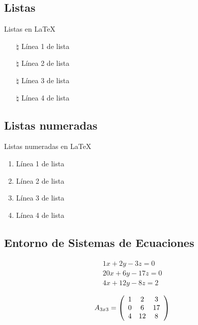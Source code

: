 \documentclass[12pt]{beamer}
\begin{document}
\subsection{Listas}
\begin{frame}{Listas en \LaTeX}
\begin{itemize}
\item[$\natural$] Línea 1 de lista
\item[$\natural$] Línea 2 de lista
\item[$\natural$] Línea 3 de lista
\item[$\natural$] Línea 4 de lista
\end{itemize}
\end{frame}

\subsection{Listas numeradas}
\begin{frame}{Listas numeradas en \LaTeX}
\begin{enumerate}
\item Línea 1 de lista
\item Línea 2 de lista
\item Línea 3 de lista
\item Línea 4 de lista
\end{enumerate}
\end{frame}
 

\subsection{Entorno de Sistemas de Ecuaciones}
\begin{frame}
\begin{eqnarray}
1x +2y -3z = 0\\
20x +6y -17z = 0\\
4x +12y -8z = 2
\end{eqnarray}

\begin{equation}
A_{3x3} = \left(
\begin{array}{c c c}
1 & 2 & 3 \\
0 & 6 & 17 \\
4 & 12 & 8
\end{array}
\right)
\end{equation}

\end{frame}
\end{document}
